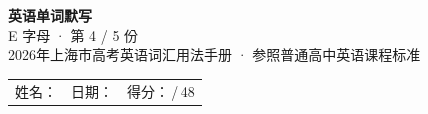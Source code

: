 \documentclass[10pt,a4paper]{article}
\begin{document}
\pagestyle{plain}

\begin{center}
{\LARGE\bfseries 英语单词默写}\\[0.22em]
{\large E 字母 · 第 4 / 5 份}\\[0.18em]
{\small 2026年上海市高考英语词汇用法手册 · 参照普通高中英语课程标准}
\end{center}

\vspace{0.25em}
\noindent\begin{tabular}{@{}p{}@{}p{}@{}p{}@{}}
姓名：\underline{\hspace{2.0cm}} & 日期：\underline{\hspace{2.0cm}} & 得分：\underline{\hspace{1.3cm}}\,/\,48 \\
\end{tabular}

\vspace{0.3em}

\vspace{0.08em}
\end{document}
